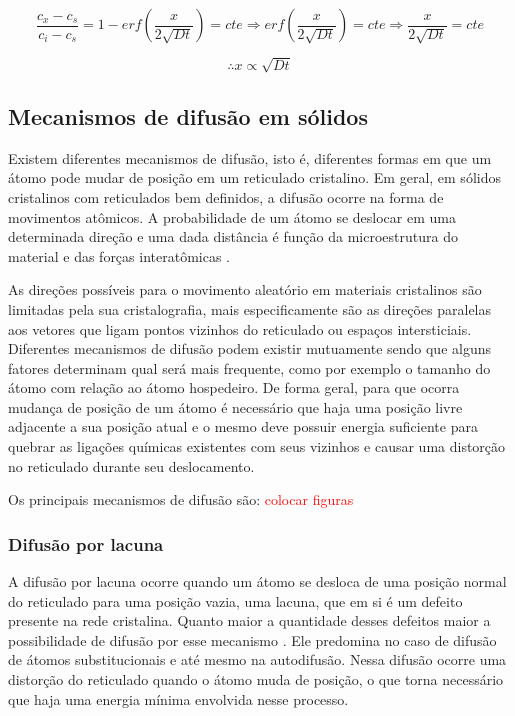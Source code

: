 \documentclass[]{politex}
\newcommand\myworries[1]{\textcolor{red}{#1}}
\begin{document}
$$\frac{c_x - c_s}{c_i - c_s} = 1 - erf(\frac{x}{2\sqrt{Dt}}) = cte \Rightarrow erf(\frac{x}{2\sqrt{Dt}}) = cte \Rightarrow \frac{x}{2\sqrt{Dt}} = cte$$

\begin{equation} \label{eq:difdist}
		\therefore x \propto  \sqrt{Dt}
\end{equation}


\subsection{Mecanismos de difusão em sólidos}
	Existem diferentes mecanismos de difusão, isto é, diferentes formas em que um átomo pode mudar de posição em um reticulado cristalino. Em geral, em sólidos cristalinos com reticulados bem definidos, a difusão ocorre na forma de movimentos atômicos. A probabilidade de um átomo se deslocar em uma determinada direção e uma dada distância é função da microestrutura do material e das forças interatômicas \cite{glicksman2000diffusion}.
	
	As direções possíveis para o movimento aleatório em materiais cristalinos são limitadas pela sua cristalografia, mais especificamente são as direções paralelas aos vetores que ligam pontos vizinhos do reticulado ou espaços intersticiais.
	Diferentes mecanismos de difusão podem existir mutuamente sendo que alguns fatores determinam qual será mais frequente, como por exemplo o tamanho do átomo com relação ao átomo hospedeiro. De forma geral, para que ocorra mudança de posição de um átomo é necessário que haja uma posição livre adjacente a sua posição atual e o mesmo deve possuir energia suficiente para quebrar as ligações químicas existentes com seus vizinhos e causar uma distorção no reticulado durante seu deslocamento. \par

Os principais mecanismos de difusão são:
\myworries{colocar figuras}
\subsubsection{Difusão por lacuna}
A difusão por lacuna ocorre quando um átomo se desloca de uma posição normal do reticulado para uma posição vazia, uma lacuna, que em si é um defeito presente na rede cristalina. Quanto maior a quantidade desses defeitos maior a possibilidade de difusão por esse mecanismo \cite{callister2007materials}. Ele predomina no caso de difusão de átomos substitucionais e até mesmo na autodifusão. Nessa difusão ocorre uma distorção do reticulado quando o átomo muda de posição, o que torna necessário que haja uma energia mínima envolvida nesse processo.
\end{document}
